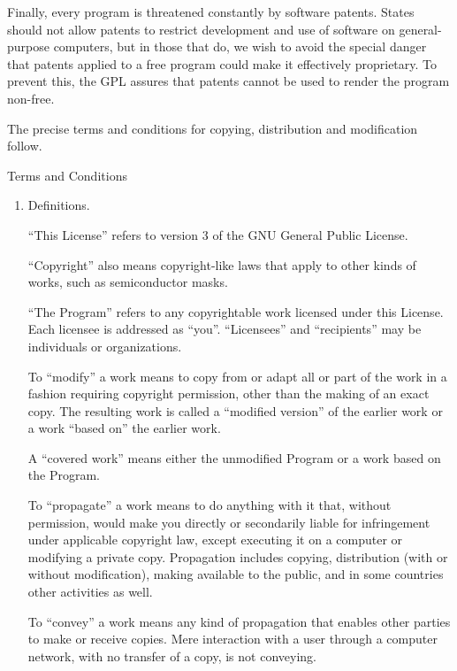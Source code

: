 \documentclass[12pt,a4paper]{book}
\begin{document}
Finally, every program is threatened constantly by software patents.
States should not allow patents to restrict development and use of
software on general-purpose computers, but in those that do, we wish to
avoid the special danger that patents applied to a free program could
make it effectively proprietary.  To prevent this, the GPL assures that
patents cannot be used to render the program non-free.

The precise terms and conditions for copying, distribution and
modification follow.


\begin{center}
{\Large \sc Terms and Conditions}
\end{center}


\begin{enumerate}

\addtocounter{enumi}{-1}

\item Definitions.

``This License'' refers to version 3 of the GNU General Public License.

``Copyright'' also means copyright-like laws that apply to other kinds of
works, such as semiconductor masks.

``The Program'' refers to any copyrightable work licensed under this
License.  Each licensee is addressed as ``you''.  ``Licensees'' and
``recipients'' may be individuals or organizations.

To ``modify'' a work means to copy from or adapt all or part of the work
in a fashion requiring copyright permission, other than the making of an
exact copy.  The resulting work is called a ``modified version'' of the
earlier work or a work ``based on'' the earlier work.

A ``covered work'' means either the unmodified Program or a work based
on the Program.

To ``propagate'' a work means to do anything with it that, without
permission, would make you directly or secondarily liable for
infringement under applicable copyright law, except executing it on a
computer or modifying a private copy.  Propagation includes copying,
distribution (with or without modification), making available to the
public, and in some countries other activities as well.

To ``convey'' a work means any kind of propagation that enables other
parties to make or receive copies.  Mere interaction with a user through
a computer network, with no transfer of a copy, is not conveying.


\end{enumerate}
\end{document}
